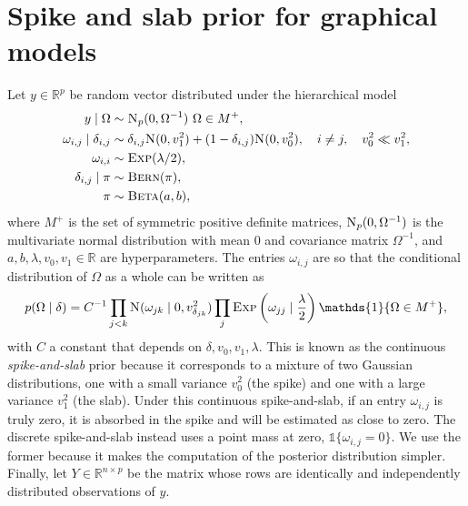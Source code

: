 \documentclass[a4paper, 11pt, oneside]{report}
\newcommand{\R}{\mathbb{R}}
\newcommand{\1}{\mathds{1}}
\newcommand{\inv}{^{-1}}
\newcommand{\Np}{\textsc{N}_p}
\newcommand{\Nor}{\textsc{N}}
\newcommand{\Bern}{\textsc{Bern}}
\newcommand{\Beeta}{\textsc{Beta}}
\newcommand{\Exp}{\textsc{Exp}}
\begin{document}
\section{Spike and slab prior for graphical models}
Let $y \in \R^p$ be random vector distributed under the hierarchical model
\begin{align*}
	y \mid \Omega                  & \sim \Np(0, \Omega\inv)\ \Omega \in M^+,                                                                     \\
	\omega_{i,j} \mid \delta_{i,j} & \sim \delta_{i,j} \Nor(0, v_1^2) + (1 - \delta_{i,j}) \Nor(0, v_0^2), \quad i \neq j, \quad v_0^2 \ll v_1^2, \\
	\omega_{i,i}                   & \sim \textsc{Exp}(\lambda / 2),                                                                              \\
	\delta_{i,j} \mid \pi          & \sim \Bern(\pi),                                                                                             \\
	\pi                            & \sim \Beeta(a,b),
\end{align*}
where $M^+$ is the set of symmetric positive definite matrices, $\Np(0, \Omega\inv)$ is the multivariate normal distribution with mean $0$ and
covariance matrix $\Omega\inv$, and $a, b, \lambda, v_0, v_1 \in \R$ are hyperparameters.
The entries $\omega_{i,j}$ are so that the conditional distribution of $\Omega$ as a whole can be written as
\[p(\Omega \mid \delta) = C\inv \prod_{j < k}  \Nor(\omega_{jk} \mid 0,
	v_{\delta_{jk}}^2) \prod_j \Exp\left(\omega_{jj} \mid \frac{\lambda}{2}\right) \1\{\Omega \in M^+ \},\]
with $C$ a constant that depends on $\delta, v_0, v_1, \lambda$.
This is known as the continuous \emph{spike-and-slab} prior because it
corresponds to a mixture of two Gaussian distributions, one with a small variance
$v_0^2$ (the spike) and one with a large variance $v_1^2$ (the slab).
Under this continuous spike-and-slab, if an entry $\omega_{i,j}$ is truly zero,
it is absorbed in the spike and will be estimated as close to zero. The
discrete spike-and-slab instead uses a point mass at zero, $\1\{\omega_{i,j} =
	0\}.$ We use the former because it makes the computation of the posterior
distribution simpler.
Finally, let $Y \in \R^{n \times p}$ be the matrix whose rows are identically and independently distributed
observations of $y$.
\end{document}

